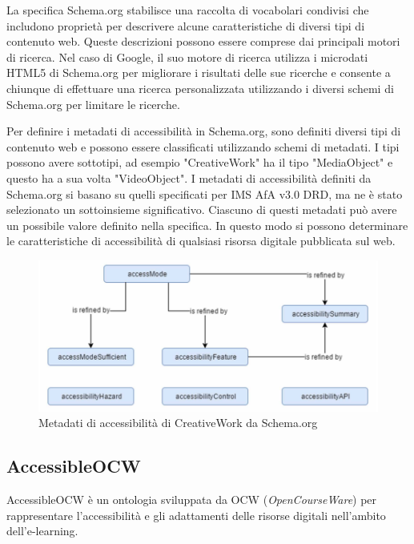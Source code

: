 La specifica Schema.org stabilisce una raccolta di vocabolari condivisi che includono proprietà per descrivere alcune caratteristiche di diversi tipi di contenuto web. Queste descrizioni possono essere comprese dai principali motori di ricerca. Nel caso di Google, il suo motore di ricerca utilizza i microdati HTML5 di Schema.org per migliorare i risultati delle sue ricerche e consente a chiunque di effettuare una ricerca personalizzata utilizzando i diversi schemi di Schema.org per limitare le ricerche.

Per definire i metadati di accessibilità in Schema.org, sono definiti diversi tipi di contenuto web e possono essere
classificati utilizzando schemi di metadati.
I tipi possono avere sottotipi, ad esempio "CreativeWork" ha il tipo "MediaObject" e questo ha a sua volta "VideoObject".
I metadati di accessibilità definiti da Schema.org si basano su quelli specificati per IMS AfA v3.0 DRD, ma ne è stato selezionato un sottoinsieme significativo. Ciascuno di questi metadati può avere un possibile valore definito nella specifica. In questo modo si possono determinare le caratteristiche di accessibilità di qualsiasi risorsa digitale pubblicata sul web.

\begin{figure}[H]
\centering
\includegraphics[scale=0.7]{res/schemaorg.png}
\caption{Metadati di accessibilità di CreativeWork da Schema.org}
\label{fig:schemaorg}
\end{figure}

\subsection{AccessibleOCW}
AccessibleOCW è un ontologia sviluppata da OCW (\textit{OpenCourseWare}) per rappresentare l'accessibilità e gli adattamenti delle risorse digitali nell'ambito dell'e-learning.

